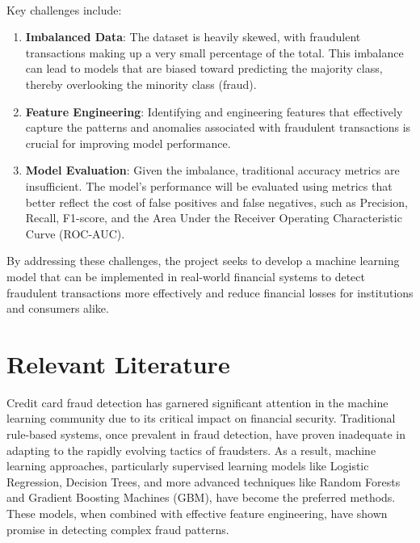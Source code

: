 \documentclass{article}
\begin{document}
\ \\
\noindent
Key challenges include:

\begin{enumerate}
    \item \textbf{Imbalanced Data}: The dataset is heavily skewed, with fraudulent transactions making up a very small percentage of the total. This imbalance can lead to models that are biased toward predicting the majority class, thereby overlooking the minority class (fraud).

    \item \textbf{Feature Engineering}: Identifying and engineering features that effectively capture the patterns and anomalies associated with fraudulent transactions is crucial for improving model performance.
    
    \item \textbf{Model Evaluation}: Given the imbalance, traditional accuracy metrics are insufficient. The model's performance will be evaluated using metrics that better reflect the cost of false positives and false negatives, such as Precision, Recall, F1-score, and the Area Under the Receiver Operating Characteristic Curve (ROC-AUC).

\end{enumerate}

\noindent
By addressing these challenges, the project seeks to develop a machine learning model that can be implemented in real-world financial systems to detect fraudulent transactions more effectively and reduce financial losses for institutions and consumers alike.

\section{Relevant Literature}

Credit card fraud detection has garnered significant attention in the machine learning community due to its critical impact on financial security. Traditional rule-based systems, once prevalent in fraud detection, have proven inadequate in adapting to the rapidly evolving tactics of fraudsters. As a result, machine learning approaches, particularly supervised learning models like Logistic Regression, Decision Trees, and more advanced techniques like Random Forests and Gradient Boosting Machines (GBM), have become the preferred methods. These models, when combined with effective feature engineering, have shown promise in detecting complex fraud patterns.
\end{document}
